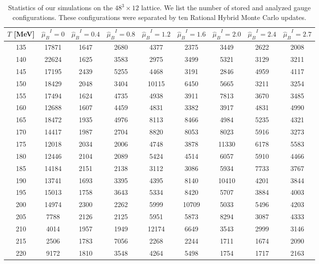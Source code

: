 \documentclass[a4paper,11pt]{article}
\begin{document}
\begin{table}[ht]
\begin{tabular}{|c|c|c|c|c|c|c|c|c|}
\hline
$T$ [MeV] &${\hat\mu_B}^I=0$&${\hat\mu_B}^I=0.4$&${\hat\mu_B}^I=0.8$&${\hat\mu_B}^I=1.2$&${\hat\mu_B}^I=1.6$&${\hat\mu_B}^I=2.0$&${\hat\mu_B}^I=2.4$&${\hat\mu_B}^I=2.7$\\\hline
135 &17871&1647&2680&4377&2375&3449&2622&2008\\
140 &22624&1625&3583&2975&3499&5321&3129&3211\\
145 &17195&2439&5255&4468&3191&2846&4959&4117\\
150 &18429&2048&3404&10115&6450&5665&3211&3254\\
155 &17494&1624&4735&4938&3911&7813&3670&3485\\
160 &12688&1607&4459&4831&3382&3917&4831&4990\\
165 &18472&1935&4976&8113&8466&4984&5235&4321\\
170 &14417&1987&2704&8820&8053&8023&5916&3273\\
175 &12018&2034&2006&4748&3878&11330&6178&5583\\
180 &12446&2104&2089&5424&4514&6057&5910&4466\\
185 &14184&2151&2138&3112&3086&5934&7733&3767\\
190 &13741&1693&3395&4395&8140&10410&4201&3844\\
195 &15013&1758&3643&5334&8420&5707&3884&4003\\
200 &14974&2300&2262&5999&10709&5033&5496&4203\\
205 &7788&2126&2125&5951&5873&8294&3087&4333\\
210 &4014&1957&1949&12174&6649&3543&2999&3146\\
215 &2506&1783&7056&2268&2244&1711&1674&2090\\
220 &9172&1810&3548&4264&5498&1754&1717&2163\\
\hline\end{tabular}
\caption{\label{tab:stat}Statistics of our simulations on the $48^3\times12$ lattice.
We list the number of stored and analyzed gauge configurations. These configurations
were separated by ten Rational Hybrid Monte Carlo updates.
}
\end{table}



\clearpage



\clearpage
\vfill
\end{document}
